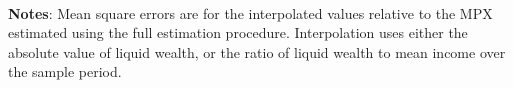 \begin{minipage}{0.65\textwidth}
\end{minipage}
\\ \textbf{Notes}: Mean square errors are for the interpolated values relative to the MPX estimated using the full estimation procedure. Interpolation uses either the absolute value of liquid wealth, or the ratio of liquid wealth to mean income over the sample period. 
